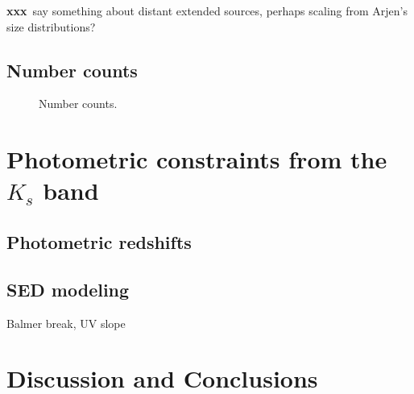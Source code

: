 \documentclass[iop, numberedappendix]{emulateapj}
\gdef\xxx{\textbf{xxx}}
\begin{document}
\xxx\ say something about distant extended sources, perhaps scaling from Arjen's size distributions?

\subsection{Number counts}
\label{s:number}

\begin{figure*}
\caption{Number counts.\label{fig:counts}}  
\end{figure*}

\section{Photometric constraints from the $K_s$ band}
\label{s:constraints}

\subsection{Photometric redshifts}
\label{s:photoz}

\subsection{SED modeling}
\label{s:sed}

Balmer break, UV slope


\section{Discussion and Conclusions}
\label{s:discussion}


%
%
\vspace{-0.3cm} %
\acknowledgements
\end{document}
